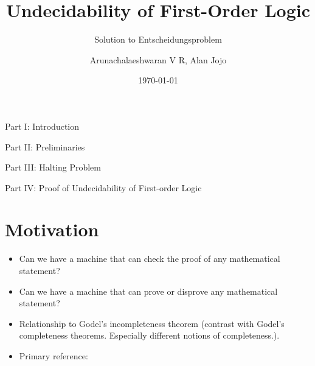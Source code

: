 \documentclass[
11pt,notheorems,hyperref={pdfauthor=whatever}
]{beamer}
\title[
]{Undecidability of First-Order Logic}
\subtitle{Solution to Entscheidungsproblem}
\author[
]{
    Arunachalaeshwaran V R,
    Alan Jojo
}
\institute{
    Indian Institute of Science}
\date{\today}
\begin{document}
{
\begin{frame}
  \titlepage
\end{frame}
}
\addtocounter{framenumber}{-1}

\begin{frame}{Part I: Introduction}
    \tableofcontents[part=1]
\end{frame}
\begin{frame}{Part II: Preliminaries}
    \tableofcontents[part=2]
\end{frame}
\begin{frame}{Part III: Halting Problem}
    \tableofcontents[part=3]
\end{frame}
\begin{frame}{Part IV: Proof of Undecidability of First-order Logic}
    \tableofcontents[part=4]
\end{frame}


\section{Motivation}
\begin{frame}
\begin{itemize}
    \setlength\itemsep{2em}
    \item Can we have a machine that can check the proof of any mathematical statement?
    \item Can we have a machine that can prove or disprove any mathematical statement?
    \item Relationship to Godel's incompleteness theorem (contrast with Godel's completeness theorems. Especially different notions of completeness.).
    \item Primary reference: \cite{boolos2002computability}
\end{itemize}     
\end{frame}
\end{document}
